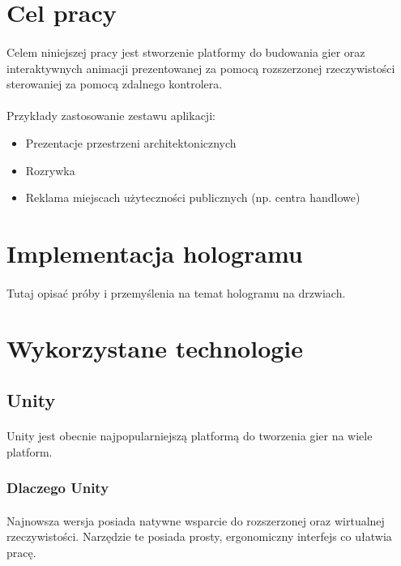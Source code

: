 \documentclass[12pt]{article}
\begin{document}
{\section{Cel pracy}
\paragraph{}
Celem niniejszej pracy jest stworzenie platformy do budowania gier oraz interaktywnych animacji prezentowanej za pomocą rozszerzonej rzeczywistości sterowaniej za pomocą zdalnego kontrolera.

\paragraph{}
Przykłady zastosowanie zestawu aplikacji:

\begin{itemize}
\item Prezentacje przestrzeni architektonicznych
\item Rozrywka
\item Reklama miejscach użyteczności publicznych (np. centra handlowe)
\end{itemize}

\section{Implementacja hologramu}
\paragraph{}
{\color{red}Tutaj opisać próby i przemyślenia na temat hologramu na drzwiach.}

\section{Wykorzystane technologie}

\subsection{Unity}
\paragraph{}
Unity jest obecnie najpopularniejszą platformą do tworzenia gier na wiele platform. 
\subsubsection{Dlaczego Unity}
\paragraph{}
Najnowsza wersja posiada natywne wsparcie do rozszerzonej oraz wirtualnej rzeczywistości. Narzędzie te posiada prosty, ergonomiczny interfejs co ułatwia pracę.
}
\end{document}

